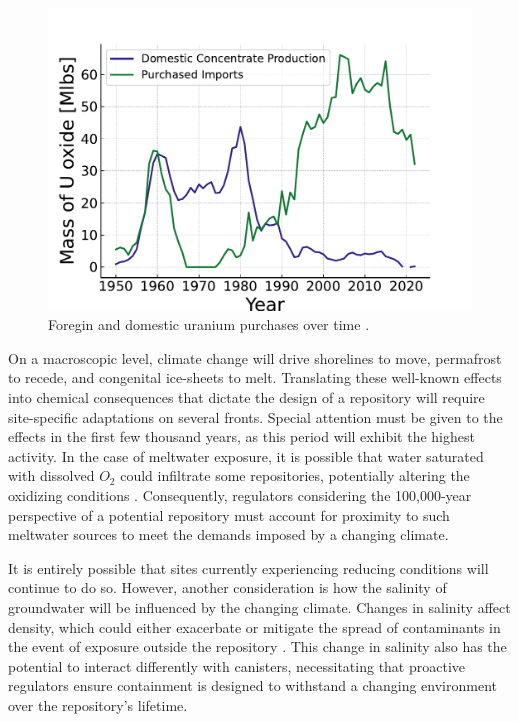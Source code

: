 \begin{figure}[!h]
   \centering
   \includegraphics[scale=0.8]{images/intro/uranium_production_imports.pdf}
   \caption{Foregin and domestic uranium purchases over time \cite{eia_monthly_energy_review_2024}.}
   \label{fig:foregin_u3o8}
\end{figure}








On a macroscopic level, climate change will drive shorelines to move, permafrost to recede, and congenital ice-sheets to melt. Translating these well-known effects into chemical consequences that dictate the design of a repository will require site-specific adaptations on several fronts. Special attention must be given to the effects in the first few thousand years, as this period will exhibit the highest activity. In the case of meltwater exposure, it is possible that water saturated with dissolved $O_2$ could infiltrate some repositories, potentially altering the oxidizing conditions \cite{gurban_hydrochemical_2001}. Consequently, regulators considering the 100,000-year perspective of a potential repository must account for proximity to such meltwater sources to meet the demands imposed by a changing climate.

It is entirely possible that sites currently experiencing reducing conditions will continue to do so. However, another consideration is how the salinity of groundwater will be influenced by the changing climate. Changes in salinity affect density, which could either exacerbate or mitigate the spread of contaminants in the event of exposure outside the repository \cite{gurban_hydrochemical_2001}. This change in salinity also has the potential to interact differently with canisters, necessitating that proactive regulators ensure containment is designed to withstand a changing environment over the repository's lifetime.

